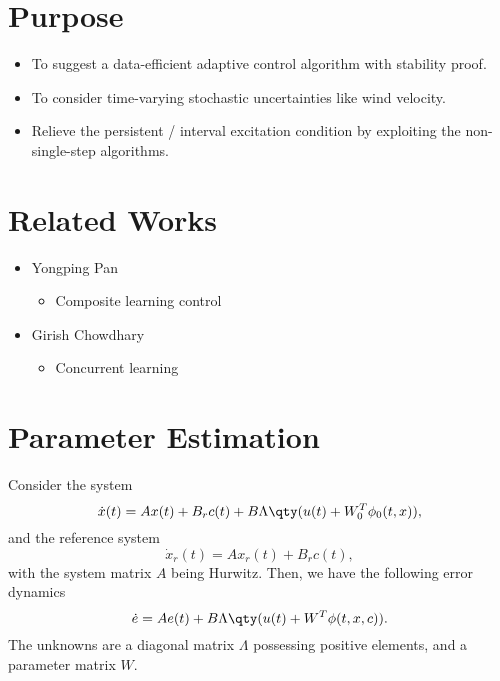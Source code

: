 \documentclass{my-handout}
\begin{document}
\maketitle

\section{Purpose}

\begin{itemize}
\item
  To suggest a data-efficient adaptive control algorithm with stability
  proof.
\item
  To consider time-varying stochastic uncertainties like wind velocity.
\item
  Relieve the persistent / interval excitation condition by exploiting
  the non-single-step algorithms.
\end{itemize}

\section{Related Works}

\begin{itemize}
	\item
		Yongping Pan\cite{pan_composite_2016,pan_composite_2018}
		\begin{itemize}
			\item
				Composite learning control
		\end{itemize}
	\item
		Girish
		Chowdhary\cite{chowdhary_concurrent_2013-1,kamalapurkar_concurrent_2017}
		\begin{itemize}
			\item
				Concurrent learning
		\end{itemize}
\end{itemize}

\section{Parameter Estimation}

Consider the system \[
\dot{x}(t) = A x(t) + B_r c(t) + B \Lambda \qty(u(t) + W_0^T \phi_0(t, x)),
\] and the reference system \[
\dot{x}_r(t) = A x_r(t) + B_r c(t),
\] with the system matrix \(A\) being Hurwitz. Then, we have the
following error dynamics \[
\dot{e} = A e(t) + B \Lambda \qty(u(t) + W^T \phi(t, x, c)).
\] The unknowns are a diagonal matrix \(\Lambda\) possessing positive
elements, and a parameter matrix \(W\).
\end{document}
